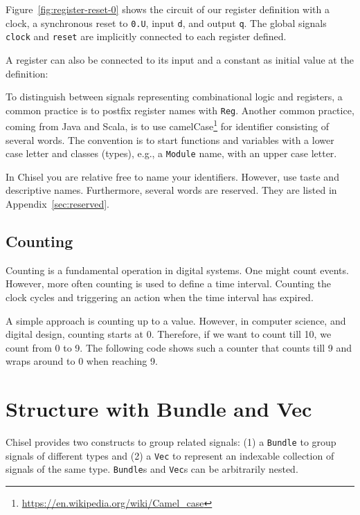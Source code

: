 \documentclass[%
    10pt,
    headinclude, footexclude,
    openright, %
    notitlepage,
    cleardoubleempty,
    headsepline,
    pointlessnumbers,
    bibtotoc, idxtotoc,
    ]{scrbook}
\newcommand{\code}[1]{{\small{\texttt{#1}}}}
\newcommand{\myref}[2]{\href{#1}{#2}}
\renewcommand{\myref}[2]{{#2}{\footnote{\url{#1}}}}
\begin{document}
Figure~\ref{fig:register-reset-0} shows the circuit of our register definition with
a clock, a synchronous reset to \code{0.U}, input \code{d}, and output \code{q}.
The global signals \code{clock} and \code{reset} are implicitly connected to
each register defined.

\noindent A register can also be connected to its input and a constant as
initial value at the definition:


\noindent To distinguish between signals representing combinational logic and registers,
a common practice is to postfix register names with \code{Reg}.
Another common practice, coming from Java and Scala, is to use
\myref{https://en.wikipedia.org/wiki/Camel_case}{camelCase} for
identifier consisting of several words. The convention is to start
functions and variables with a lower case letter and classes (types),
e.g., a \code{Module} name, with an upper case letter.

In Chisel you are relative free to name your identifiers. However, use taste and
descriptive names. Furthermore, several words are reserved. They are listed
in Appendix~\ref{sec:reserved}.




\subsection{Counting}

Counting is a fundamental operation in digital systems. One might count events.
However, more often counting is used to define a time interval. Counting the
clock cycles and triggering an action when the time interval has expired.

A simple approach is counting up to a value. However, in computer science,
and digital design, counting starts at 0. Therefore, if we want to count till
10, we count from 0 to 9. The following code shows such a counter that counts
till 9 and wraps around to 0 when reaching 9.


\section{Structure with Bundle and Vec}


Chisel provides two constructs to group related signals: (1) a \code{Bundle} to group
signals of different types and (2) a \code{Vec} to represent an indexable collection of signals
of the same type.
\code{Bundle}s and \code{Vec}s can be arbitrarily nested.
\end{document}
